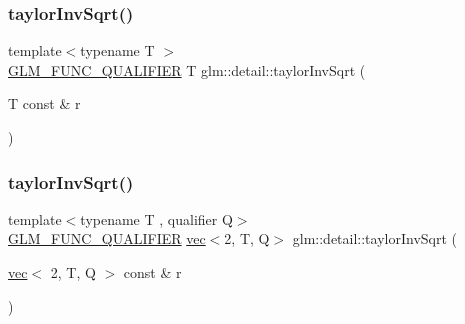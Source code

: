 \mbox{\label{namespaceglm_1_1detail_a82e6fa9d633a5f76f8b7e046ac5d91f4}} 
\subsubsection{\texorpdfstring{taylor\+Inv\+Sqrt()}{taylorInvSqrt()}\hspace{0.1cm}{\footnotesize\ttfamily [1/4]}}
{\footnotesize\ttfamily template$<$typename T $>$ \\
\mbox{\hyperlink{setup_8hpp_a33fdea6f91c5f834105f7415e2a64407}{G\+L\+M\+\_\+\+F\+U\+N\+C\+\_\+\+Q\+U\+A\+L\+I\+F\+I\+ER}} T glm\+::detail\+::taylor\+Inv\+Sqrt (\begin{DoxyParamCaption}\item[{T const \&}]{r }\end{DoxyParamCaption})}

\mbox{\label{namespaceglm_1_1detail_aa7082f2eab56cda8156f3ab94e8653a2}} 
\subsubsection{\texorpdfstring{taylor\+Inv\+Sqrt()}{taylorInvSqrt()}\hspace{0.1cm}{\footnotesize\ttfamily [2/4]}}
{\footnotesize\ttfamily template$<$typename T , qualifier Q$>$ \\
\mbox{\hyperlink{setup_8hpp_a33fdea6f91c5f834105f7415e2a64407}{G\+L\+M\+\_\+\+F\+U\+N\+C\+\_\+\+Q\+U\+A\+L\+I\+F\+I\+ER}} \mbox{\hyperlink{structglm_1_1vec}{vec}}$<$2, T, Q$>$ glm\+::detail\+::taylor\+Inv\+Sqrt (\begin{DoxyParamCaption}\item[{\mbox{\hyperlink{structglm_1_1vec}{vec}}$<$ 2, T, Q $>$ const \&}]{r }\end{DoxyParamCaption})}

\mbox{\label{namespaceglm_1_1detail_a5de2dc069a7f92df3b0bfdd27b70e1c3}} 
